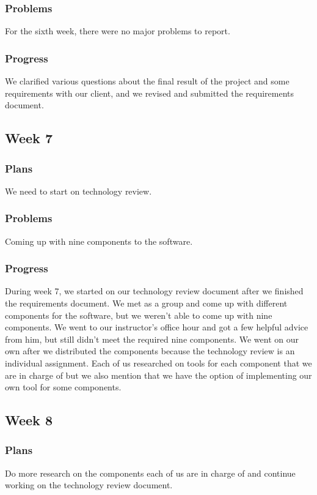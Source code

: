 \documentclass[onecolumn, draftclsnofoot, 10pt, compsoc]{IEEEtran}
\begin{document}
\subsubsection{Problems}
For the sixth week, there were no major problems to report.
\subsubsection{Progress}
We clarified various questions about the final result of the project and some requirements with our client, and we revised and submitted the requirements document.

\subsection{Week 7}
\subsubsection{Plans}
We need to start on technology review.

\subsubsection{Problems}
Coming up with nine components to the software.

\subsubsection{Progress}
During week 7, we started on our technology review document after we finished the requirements document. We met as a group and come up with different components for the software, but we weren't able to come up with nine components. We went to our instructor's office hour and got a few helpful advice from him, but still didn't meet the required nine components. We went on our own after we distributed the components because the technology review is an individual assignment. Each of us researched on tools for each component that we are in charge of but we also mention that we have the option of implementing our own tool for some components.  


\subsection{Week 8}
\subsubsection{Plans}
Do more research on the components each of us are in charge of and continue working on the technology review document.
\end{document}
